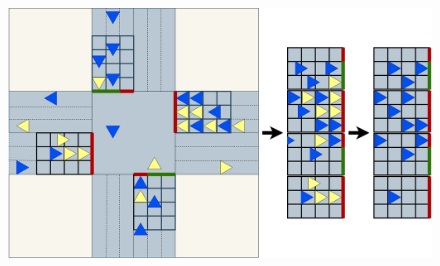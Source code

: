 \begin{figure}[h]
\includegraphics[width=\textwidth]{img/II/pdtse_full.png}
\centering
\end{figure}

